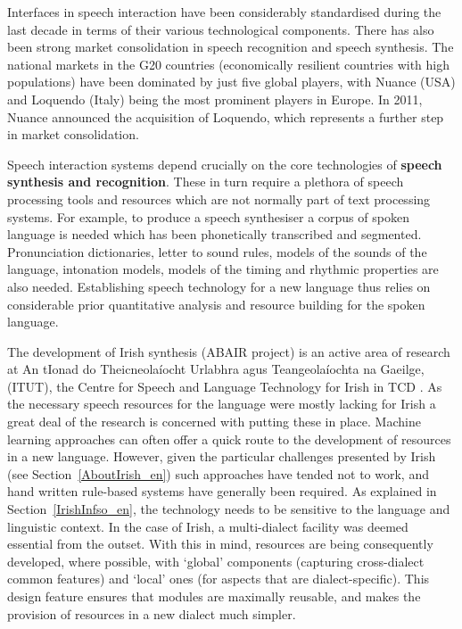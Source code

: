 \begin{multicols}{2}
Interfaces in speech interaction have been considerably standardised during the last decade in terms of their various technological components. There has also been strong market consolidation in speech recognition and speech synthesis. The national markets in the G20 countries (economically resilient countries with high populations) have been dominated by just five global players, with Nuance (USA) and Loquendo (Italy) being the most prominent players in Europe. In 2011, Nuance announced the acquisition of Loquendo, which represents a further step in market consolidation.
\columnbreak


Speech interaction systems depend crucially on the core technologies of \textbf{speech synthesis and recognition}. These in turn require a plethora of speech processing tools and resources which are not normally part of text processing systems. For example, to produce a speech synthesiser a corpus of spoken language is needed which has been phonetically transcribed and segmented. Pronunciation dictionaries, letter to sound rules, models of the sounds of the language, intonation models, models of the timing and rhythmic properties are also needed. Establishing speech technology for a new language thus relies on considerable prior quantitative analysis and resource building for the spoken language. 

The development of Irish synthesis (ABAIR project) is an active area of research at An tIonad do Theicneolaíocht Urlabhra agus Teangeolaíochta na Gaeilge, (ITUT), the Centre for Speech and Language Technology for Irish in TCD \cite{pittsburgh}.  As the necessary speech resources for the language were mostly lacking for Irish a great deal of the research is concerned with putting these in place. Machine learning approaches can often offer a quick route to the development of resources in a new language. However, given the particular challenges presented by Irish (see Section~\ref{AboutIrish_en}) such approaches have tended not to work, and hand written rule-based systems have generally been required. As explained in Section~\ref{IrishInfso_en}, the technology needs to be sensitive to the language and linguistic context. In the case of Irish, a multi-dialect facility was deemed essential from the outset. With this in mind, resources are being consequently developed, where possible, with `global’ components (capturing cross-dialect common features) and `local' ones (for aspects that are dialect-specific). This design feature ensures that modules are maximally reusable, and makes the provision of resources in a new dialect much simpler.


\end{multicols}

